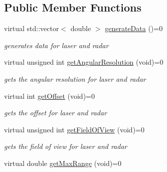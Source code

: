 \subsection*{Public Member Functions}
\begin{DoxyCompactItemize}
\item 
virtual std\+::vector$<$ double $>$ \hyperlink{classRangerInterface_a969c670cadf55a15733809116dc305c8}{generate\+Data} ()=0\hypertarget{classRangerInterface_a969c670cadf55a15733809116dc305c8}{}\label{classRangerInterface_a969c670cadf55a15733809116dc305c8}

\begin{DoxyCompactList}\small\item\em generates data for laser and radar \end{DoxyCompactList}\item 
virtual unsigned int \hyperlink{classRangerInterface_a37d4f89daffa8b2708dfc11034893552}{get\+Angular\+Resolution} (void)=0\hypertarget{classRangerInterface_a37d4f89daffa8b2708dfc11034893552}{}\label{classRangerInterface_a37d4f89daffa8b2708dfc11034893552}

\begin{DoxyCompactList}\small\item\em gets the angular resolution for laser and radar \end{DoxyCompactList}\item 
virtual int \hyperlink{classRangerInterface_a8d77cf9d9b95fe8fb315931f2f278fec}{get\+Offset} (void)=0\hypertarget{classRangerInterface_a8d77cf9d9b95fe8fb315931f2f278fec}{}\label{classRangerInterface_a8d77cf9d9b95fe8fb315931f2f278fec}

\begin{DoxyCompactList}\small\item\em gets the offset for laser and radar \end{DoxyCompactList}\item 
virtual unsigned int \hyperlink{classRangerInterface_a18716da6932402b8dda75f682be6f06c}{get\+Field\+Of\+View} (void)=0\hypertarget{classRangerInterface_a18716da6932402b8dda75f682be6f06c}{}\label{classRangerInterface_a18716da6932402b8dda75f682be6f06c}

\begin{DoxyCompactList}\small\item\em gets the field of view for laser and radar \end{DoxyCompactList}\item 
virtual double \hyperlink{classRangerInterface_a0bb29a41de5767c99081002c0590c186}{get\+Max\+Range} (void)=0\hypertarget{classRangerInterface_a0bb29a41de5767c99081002c0590c186}{}\label{classRangerInterface_a0bb29a41de5767c99081002c0590c186}


\end{DoxyCompactItemize}
